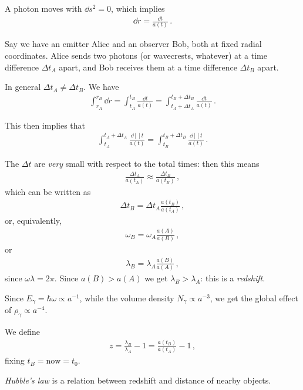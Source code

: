 \documentclass[main.tex]{subfiles}
\begin{document}
A photon moves with \(\dd{s^2} =0\), which implies 
%
\begin{align}
\dd{r} = \frac{ \dd{t}}{a(t)}
\,.
\end{align}

Say we have an emitter Alice and an observer Bob, both at fixed radial coordinates. Alice sends two photons (or wavecrests, whatever) at a time difference  \(\Delta t_A\) apart, and Bob receives them at a time difference \(\Delta t_B\) apart. 

In general \(\Delta t_A \neq \Delta t_B\). We have 
%
\begin{align}
\int_{r_A}^{r_B} \dd{r} = \int_{t_A}^{t_B}  \frac{ \dd{t}}{a(t)} 
= \int_{t_A + \Delta t_A}^{t_B + \Delta t_B}  \frac{ \dd{t}}{a(t)} 
\,.
\end{align}

This then implies that 
%
\begin{align}
\int_{ t_A }^{ t_A + \Delta t_A} \frac{ \dd[]{t}}{a(t)} = 
\int_{ t_B }^{ t_B  + \Delta t_B} \frac{ \dd[]{t}}{a(t)} 
\,.
\end{align}

The \(\Delta t\) are \emph{very} small with respect to the total times: then this means 
%
\begin{align}
\frac{\Delta t_A}{a(t_A)} \approx \frac{ \Delta t_B}{ a(t_B)}
\,,
\end{align}
%
which can be written as 
%
\begin{align}
\Delta t_B = \Delta t_A \frac{a(t_B)}{a(t_A)}
\,,
\end{align}
%
or, equivalently, 
%
\begin{align}
\omega_{B} = \omega_{A} \frac{a(A)}{a(B)}
\,,
\end{align}
%
or 
%
\begin{align}
\lambda_{B} = \lambda_{A} \frac{a(B)}{a(A)}
\,,
\end{align}
%
since \(\omega \lambda = 2 \pi \). Since \(a(B) > a(A)\) we get \(\lambda_{B} > \lambda_{A}\): this is a \emph{redshift}. 

Since \(E_{\gamma } = \hbar \omega \propto a^{-1}\), while the volume density \(N_{\gamma } \propto a^{-3}\), we get the global effect of \(\rho_{\gamma } \propto a^{-4}\). 

We define 
%
\begin{align}
z = \frac{\lambda_{B}}{\lambda_{A}} - 1 = \frac{a(t_{B})}{a(t_{A})} - 1
\,,
\end{align}
%
fixing \(t_B = \text{now} = t_0 \). 

\emph{Hubble's law} is a relation between redshift and distance of nearby objects. 
\end{document}
